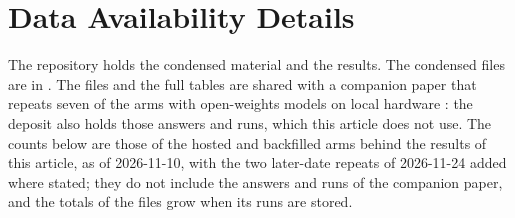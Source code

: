 \section{Data Availability Details}
\label{app:data}

The repository holds the condensed material and the results. The condensed files are in . The files and the full tables are shared with a companion paper that repeats seven of the arms with open-weights models on local hardware \cite{regan2026openweights}: the deposit also holds those answers and runs, which this article does not use. The counts below are those of the hosted and backfilled arms behind the results of this article, as of 2026-11-10, with the two later-date repeats of 2026-11-24 added where stated; they do not include the answers and runs of the companion paper, and the totals of the files grow when its runs are stored.
